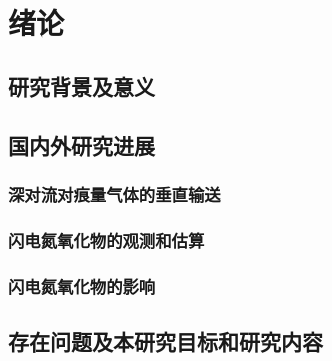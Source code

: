 \chapter{绪论}

\section{研究背景及意义}

\section{国内外研究进展}

\subsection{深对流对痕量气体的垂直输送}

\subsection{闪电氮氧化物的观测和估算}

\subsection{闪电氮氧化物的影响}

\section{存在问题及本研究目标和研究内容}

